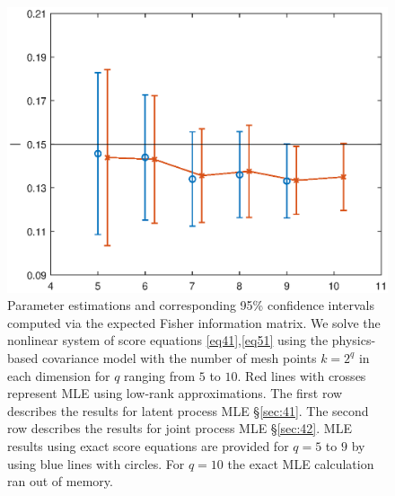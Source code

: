 \documentclass[article,ij4uq]{ij4uq}              %
\begin{document}
\begin{figure}[!t]
{\begin{minipage}[t]{0.235\textwidth}
  \includegraphics[width=1\textwidth]{images/l_joint.eps}
\end{minipage}}
\caption{Parameter estimations and corresponding 95\% confidence intervals computed via the expected Fisher information matrix. We solve the nonlinear system of score equations \eqref{eq41},\eqref{eq51} using the physics-based covariance model with the number of mesh points $k=2^q$ in each dimension for $q$ ranging from $5$ to $10$. Red lines with crosses represent MLE using low-rank approximations. The first row describes the results for latent process MLE \S \ref{sec:41}. The second row describes the results for joint process MLE \S \ref{sec:42}. MLE results using exact score equations are provided for $q=5$ to $9$ by using blue lines with circles. For $q=10$ the exact MLE calculation ran out of memory.} \label{fig:1}
\end{figure}
\end{document}
